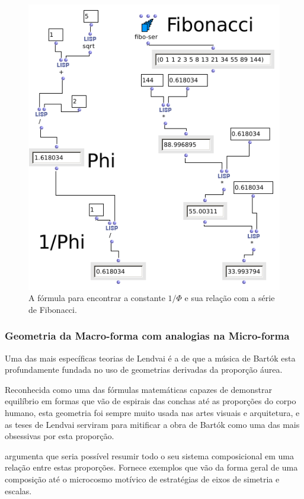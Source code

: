 \documentclass[
	12pt,				%
	openright,			%
	twoside,			%
	a4paper,			%
	english,			%
	french,				%
	spanish,			%
	brazil				%
	]{abntex2}
\begin{document}
\begin{figure}[!h]
	\caption{\label{fig_grafico}A fórmula para encontrar a constante $1/\Phi$ e sua relação com a série de Fibonacci. }
	\begin{center}
	    \includegraphics[scale=0.5]{OM_settheory/aurea.png}
	\end{center}
\end{figure}	

\pagebreak
\subsubsection{Geometria da Macro-forma com analogias na Micro-forma}

Uma das mais específicas teorias de Lendvai é a de que a música de Bartók esta profundamente fundada no uso de geometrias derivadas da proporção áurea. 

Reconhecida como uma das fórmulas matemáticas capazes de demonstrar equilíbrio em formas que vão de espirais das conchas até as proporções do corpo humano, esta geometria foi sempre muito usada nas artes visuais e arquitetura, e as teses de Lendvai serviram para mitificar a obra de Bartók como uma das mais obsessivas por esta proporção.

 argumenta que seria possível resumir todo o seu sistema composicional em uma relação entre estas proporções. Fornece exemplos que vão da forma geral de uma composição até o microcosmo motívico de estratégias de eixos de simetria e escalas.
\end{document}

